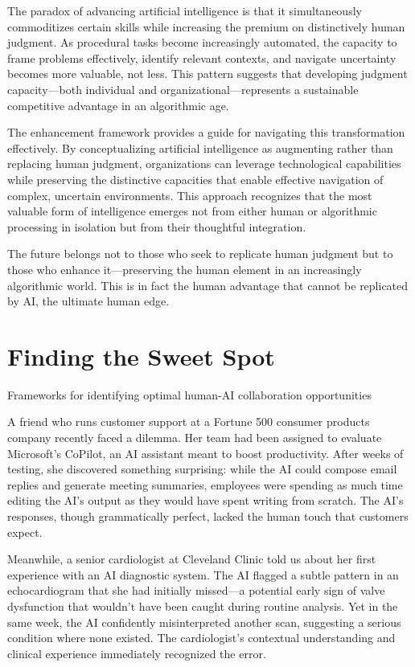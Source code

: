 \documentclass[
  Letterpaper,
]{scrbook}
\begin{document}
The paradox of advancing artificial intelligence is that it
simultaneously commoditizes certain skills while increasing the premium
on distinctively human judgment. As procedural tasks become increasingly
automated, the capacity to frame problems effectively, identify relevant
contexts, and navigate uncertainty becomes more valuable, not less. This
pattern suggests that developing judgment capacity---both individual and
organizational---represents a sustainable competitive advantage in an
algorithmic age.

The enhancement framework provides a guide for navigating this
transformation effectively. By conceptualizing artificial intelligence
as augmenting rather than replacing human judgment, organizations can
leverage technological capabilities while preserving the distinctive
capacities that enable effective navigation of complex, uncertain
environments. This approach recognizes that the most valuable form of
intelligence emerges not from either human or algorithmic processing in
isolation but from their thoughtful integration.

The future belongs not to those who seek to replicate human judgment but
to those who enhance it---preserving the human element in an
increasingly algorithmic world. This is in fact the human advantage that
cannot be replicated by AI, the ultimate human edge.


\chapter{Finding the Sweet Spot}\label{finding-the-sweet-spot}

Frameworks for identifying optimal human-AI collaboration opportunities

\hfill\break

A friend who runs customer support at a Fortune 500 consumer products
company recently faced a dilemma. Her team had been assigned to evaluate
Microsoft's CoPilot, an AI assistant meant to boost productivity. After
weeks of testing, she discovered something surprising: while the AI
could compose email replies and generate meeting summaries, employees
were spending as much time editing the AI's output as they would have
spent writing from scratch. The AI's responses, though grammatically
perfect, lacked the human touch that customers expect.

Meanwhile, a senior cardiologist at Cleveland Clinic told us about her
first experience with an AI diagnostic system. The AI flagged a subtle
pattern in an echocardiogram that she had initially missed---a potential
early sign of valve dysfunction that wouldn't have been caught during
routine analysis. Yet in the same week, the AI confidently
misinterpreted another scan, suggesting a serious condition where none
existed. The cardiologist's contextual understanding and clinical
experience immediately recognized the error.
\end{document}
